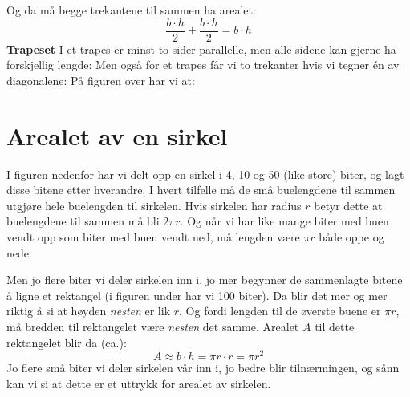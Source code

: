 Og da må begge trekantene til sammen ha arealet:
 \[ \frac{b\cdot h}{2}+\frac{b\cdot h}{2} =b\cdot h \]
\vsk
\textbf{Trapeset}\os
I et trapes er minst to sider parallelle, men alle sidene kan gjerne ha forskjellig lengde:
Men også for et trapes får vi to trekanter hvis vi tegner én av diagonalene:
På figuren over har vi at:


\section{Arealet av en sirkel}
I figuren nedenfor har vi delt opp en sirkel i 4, 10 og 50 (like store) biter, og lagt disse bitene etter hverandre.
I hvert tilfelle må de små buelengdene til sammen utgjøre hele buelengden til sirkelen. Hvis sirkelen har radius $ r $ betyr dette at buelengdene til sammen må bli $ 2\pi r $. Og når vi har like mange biter med buen vendt opp som biter med buen vendt ned, må lengden være $ \pi r $ både oppe og nede. \vsk

Men jo flere biter vi deler sirkelen inn i, jo mer begynner de sammenlagte bitene å ligne et rektangel (i figuren under har vi 100 biter). Da blir det mer og mer riktig å si at høyden \textit{nesten} er lik $ r $. Og fordi lengden til de øverste buene er $ \pi r $, må bredden til rektangelet være \textit{nesten} det samme.
 Arealet  $ A $ til dette rektangelet blir da (ca.):
\[ A\approx b\cdot h = \pi r\cdot r = \pi r^2 \]
Jo flere små biter vi deler sirkelen vår inn i, jo bedre blir tilnærmingen, og sånn kan vi si at dette er et uttrykk for arealet av sirkelen.\regv
{}
